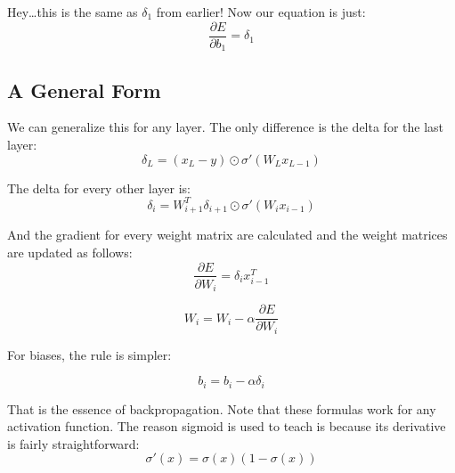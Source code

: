\documentclass{article}
\begin{document}
Hey\ldots this is the same as $\delta_1$ from earlier! Now our equation is just:
\[
\dfrac{\partial E}{\partial b_1} = \delta_1
\]

\subsection{A General Form}
We can generalize this for any layer. The only difference is the delta for the last layer:
\[\delta_L = (x_L - y) \odot \sigma'(W_{L}x_{L-1})\]

The delta for every other layer is:
\[\delta_i = W_{i+1}^T\delta_{i+1} \odot \sigma'(W_ix_{i-1})\]

And the gradient for every weight matrix are calculated and the weight matrices are updated as follows:
\[\frac{\partial E}{\partial W_i} = \delta_i x_{i-1}^T\]

\[W_i =  W_i - \alpha \frac{\partial E}{\partial W_i}\]

For biases, the rule is simpler:

\[b_i =  b_i - \alpha \delta_i\]

That is the essence of backpropagation. Note that these formulas work for any activation function. The reason sigmoid is used to teach is because its derivative is fairly straightforward:
\[\sigma'(x) = \sigma(x)(1-\sigma(x))\]
\end{document}

